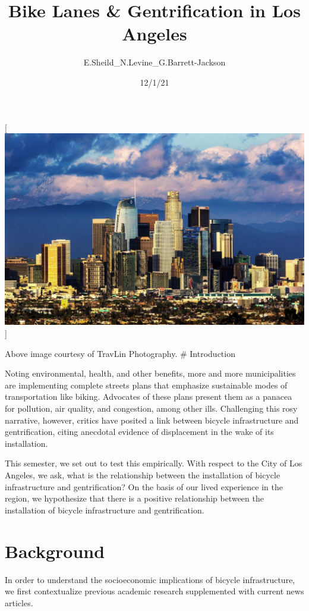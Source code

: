 \documentclass[
]{article}
\title{Bike Lanes \& Gentrification in Los Angeles}
\author{E.Sheild\_N.Levine\_G.Barrett-Jackson}
\date{12/1/21}
\begin{document}
\maketitle

{
\setcounter{tocdepth}{3}
\tableofcontents
}
{[}\includegraphics{Quant-main/thumbnails/LA.png}{]}

Above image courtesy of TravLin Photography. \# Introduction

Noting environmental, health, and other benefits, more and more
municipalities are implementing complete streets plans that emphasize
sustainable modes of transportation like biking. Advocates of these
plans present them as a panacea for pollution, air quality, and
congestion, among other ills. Challenging this rosy narrative, however,
critics have posited a link between bicycle infrastructure and
gentrification, citing anecdotal evidence of displacement in the wake of
its installation.

This semester, we set out to test this empirically. With respect to the
City of Los Angeles, we ask, what is the relationship between the
installation of bicycle infrastructure and gentrification? On the basis
of our lived experience in the region, we hypothesize that there is a
positive relationship between the installation of bicycle infrastructure
and gentrification.

\hypertarget{background}{%
\section{Background}\label{background}}

In order to understand the socioeconomic implications of bicycle
infrastructure, we first contextualize previous academic research
supplemented with current news articles.
\end{document}
